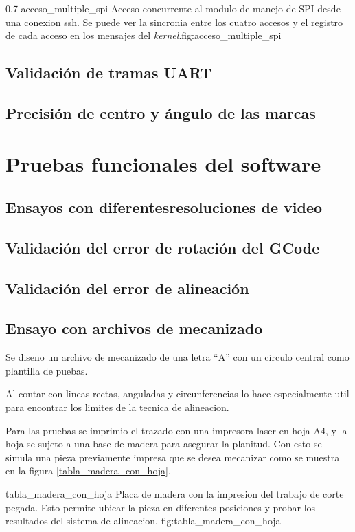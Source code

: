 \subfiga
{0.7} {acceso_multiple_spi} {Acceso concurrente al modulo de manejo de SPI desde una conexion ssh. Se puede ver la sincronia entre los cuatro accesos y el registro de cada acceso en los mensajes del \textit{kernel}.}{fig:acceso_multiple_spi}


\subsection{Validación de tramas UART}
\subsection{Precisión de centro y ángulo de las marcas}

\section{Pruebas funcionales del software}
\subsection{Ensayos con diferentesresoluciones de video}

\subsection{Validación del error de rotación del GCode}
\subsection{Validación del error de alineación}
\subsection{Ensayo con archivos de mecanizado}

Se diseno un archivo de mecanizado de una letra ``A'' con un circulo central como plantilla de puebas.\par
Al contar con lineas rectas, anguladas y circunferencias lo hace especialmente util para encontrar los limites de la tecnica de alineacion. \par
Para las pruebas se imprimio el trazado con una impresora laser en hoja A4, y la hoja se sujeto a una base de madera para asegurar la planitud. Con esto se simula una pieza previamente impresa que se desea mecanizar como se muestra en la figura \ref{tabla_madera_con_hoja}.\par

    {tabla_madera_con_hoja} {Placa de madera con la impresion del trabajo de corte pegada. Esto permite ubicar la pieza en diferentes posiciones y probar los resultados del sistema de alineacion.} {fig:tabla_madera_con_hoja}

